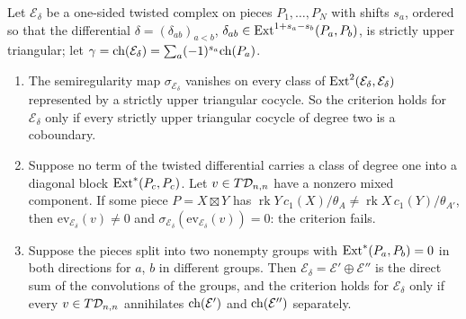 \begin{proposition}[Convolutions]\label{prop:convolution}
Let $\mathcal{E}_{\delta}$ be a one-sided twisted complex on pieces $P_{1},\dots,P_{N}$ with shifts $s_{a}$, ordered so that the differential $\delta=(\delta_{ab})_{a<b}$, $\delta_{ab}\in\mathrm{Ext}^{1+s_{a}-s_{b}}(P_{a},P_{b})$, is strictly upper triangular; let $\gamma=\mathrm{ch}(\mathcal{E}_{\delta})=\sum_{a}(-1)^{s_{a}}\mathrm{ch}(P_{a})$.
\begin{enumerate}[label=\textup{(\roman*)},leftmargin=2.4em,itemsep=2pt]
\item The semiregularity map $\sigma_{\mathcal{E}_{\delta}}$ vanishes on every class of $\mathrm{Ext}^{2}(\mathcal{E}_{\delta},\mathcal{E}_{\delta})$ represented by a strictly upper triangular cocycle. So the criterion holds for $\mathcal{E}_{\delta}$ only if every strictly upper triangular cocycle of degree two is a coboundary.
\item Suppose no term of the twisted differential carries a class of degree one into a diagonal block $\mathrm{Ext}^{*}(P_{c},P_{c})$. Let $v\in T\mathcal{D}_{n,n}$ have a nonzero mixed component. If some piece $P=X\boxtimes Y$ has $\operatorname{rk}Y\,c_{1}(X)/\theta_{A}\ne\operatorname{rk}X\,c_{1}(Y)/\theta_{A'}$, then $\mathrm{ev}_{\mathcal{E}_{\delta}}(v)\ne0$ and $\sigma_{\mathcal{E}_{\delta}}(\mathrm{ev}_{\mathcal{E}_{\delta}}(v))=0$: the criterion fails.
\item Suppose the pieces split into two nonempty groups with $\mathrm{Ext}^{*}(P_{a},P_{b})=0$ in both directions for $a$, $b$ in different groups. Then $\mathcal{E}_{\delta}=\mathcal{E}'\oplus\mathcal{E}''$ is the direct sum of the convolutions of the groups, and the criterion holds for $\mathcal{E}_{\delta}$ only if every $v\in T\mathcal{D}_{n,n}$ annihilates $\mathrm{ch}(\mathcal{E}')$ and $\mathrm{ch}(\mathcal{E}'')$ separately.
\end{enumerate}
\end{proposition}

